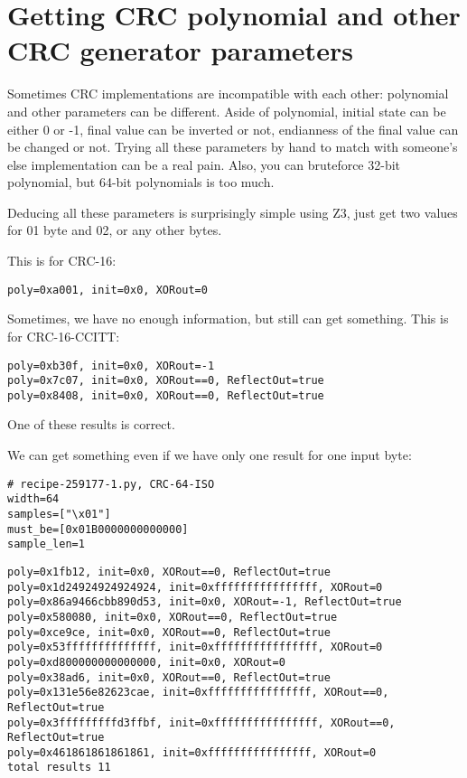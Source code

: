 \section{Getting CRC polynomial and other CRC generator parameters}

Sometimes CRC implementations are incompatible with each other: polynomial and other parameters can be different.
Aside of polynomial, initial state can be either 0 or -1, final value can be inverted or not, endianness of the final value can be changed or not.
Trying all these parameters by hand to match with someone's else implementation can be a real pain.
Also, you can bruteforce 32-bit polynomial, but 64-bit polynomials is too much.

Deducing all these parameters is surprisingly simple using Z3, just get two values for 01 byte and 02, or any other bytes.



This is for CRC-16:

\begin{lstlisting}
poly=0xa001, init=0x0, XORout=0
\end{lstlisting}

Sometimes, we have no enough information, but still can get something. This is for CRC-16-CCITT:

\begin{lstlisting}
poly=0xb30f, init=0x0, XORout=-1
poly=0x7c07, init=0x0, XORout==0, ReflectOut=true
poly=0x8408, init=0x0, XORout==0, ReflectOut=true
\end{lstlisting}

One of these results is correct.

We can get something even if we have only one result for one input byte:

\begin{lstlisting}[style=custompy]
# recipe-259177-1.py, CRC-64-ISO
width=64
samples=["\x01"]
must_be=[0x01B0000000000000]
sample_len=1
\end{lstlisting}

\begin{lstlisting}
poly=0x1fb12, init=0x0, XORout==0, ReflectOut=true
poly=0x1d24924924924924, init=0xffffffffffffffff, XORout=0
poly=0x86a9466cbb890d53, init=0x0, XORout=-1, ReflectOut=true
poly=0x580080, init=0x0, XORout==0, ReflectOut=true
poly=0xce9ce, init=0x0, XORout==0, ReflectOut=true
poly=0x53ffffffffffffff, init=0xffffffffffffffff, XORout=0
poly=0xd800000000000000, init=0x0, XORout=0
poly=0x38ad6, init=0x0, XORout==0, ReflectOut=true
poly=0x131e56e82623cae, init=0xffffffffffffffff, XORout==0, ReflectOut=true
poly=0x3fffffffffd3ffbf, init=0xffffffffffffffff, XORout==0, ReflectOut=true
poly=0x461861861861861, init=0xffffffffffffffff, XORout=0
total results 11
\end{lstlisting}

